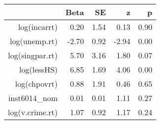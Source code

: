 \begin{table}[ht]
\centering
\begin{tabular}{rrrrr}
  \hline
 & Beta & SE & z & p \\ 
  \hline
log(incarrt) & 0.20 & 1.54 & 0.13 & 0.90 \\ 
  log(unemp.rt) & -2.70 & 0.92 & -2.94 & 0.00 \\ 
  log(singpar.rt) & 5.70 & 3.16 & 1.80 & 0.07 \\ 
  log(lessHS) & 6.85 & 1.69 & 4.06 & 0.00 \\ 
  log(chpovrt) & 0.88 & 1.91 & 0.46 & 0.65 \\ 
  inst6014\_nom & 0.01 & 0.01 & 1.11 & 0.27 \\ 
  log(v.crime.rt) & 1.07 & 0.92 & 1.17 & 0.24 \\ 
   \hline
\end{tabular}
\end{table}
